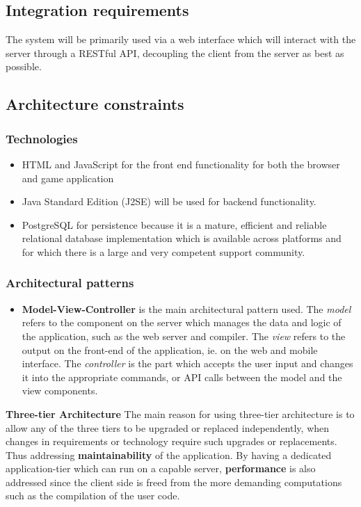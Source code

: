 \documentclass[english]{article}
\begin{document}
			
		\subsection{Integration requirements}
			\par The system will be primarily used via a web interface which will interact with the server through a RESTful API, decoupling the client from the server as best as possible.
			
		\setcounter{secnumdepth}{5}
		\subsection{Architecture constraints}
			\subsubsection{Technologies}
			\begin{itemize}
		  \item HTML and JavaScript for the front end functionality for both the browser and game application
		  \item Java Standard Edition (J2SE) will be used for backend functionality.
		  \item PostgreSQL for persistence because it is a mature, efficient and reliable relational database
          implementation which is available across platforms and for which there is a large and very competent
         support community.
       \end{itemize}
       
		\subsubsection{Architectural patterns} %
		\begin{itemize}
			\item \textbf{Model-View-Controller} is the main architectural pattern used. The \textit{model} refers to the component on the server which manages the data and logic of the application, such as the web server and compiler. The \textit{view} refers to the output on the front-end of the application, ie. on the web and mobile interface. The \textit{controller} is the part which accepts the user input and changes it into the appropriate commands, or API calls between the model and the view components.
		\end{itemize}
		
		\iffalse
		\textbf{Three-tier Architecture} %
		The main reason for using three-tier architecture is to allow any of the three tiers to be upgraded or replaced independently, when changes in requirements or technology require such upgrades or replacements. Thus addressing \textbf{maintainability} of the application. By having a dedicated application-tier which can run on a capable server, \textbf{performance} is also addressed since the client side is freed from the more demanding computations such as the compilation of the user code.
		
\end{document}
